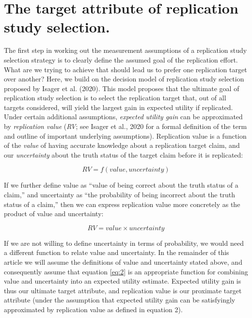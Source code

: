 \documentclass[
  english,
  man,floatsintext]{apa6}
\begin{document}
\hypertarget{the-target-attribute-of-replication-study-selection.}{%
\section{The target attribute of replication study selection.}\label{the-target-attribute-of-replication-study-selection.}}

The first step in working out the measurement assumptions of a replication study selection strategy is to clearly define the assumed goal of the replication effort. What are we trying to achieve that should lead us to prefer one replication target over another? Here, we build on the decision model of replication study selection proposed by Isager et al. (2020). This model proposes that the ultimate goal of replication study selection is to select the replication target that, out of all targets considered, will yield the largest gain in expected utility if replicated. Under certain additional assumptions, \emph{expected utility gain} can be approximated by \emph{replication value} (\emph{RV}; see Isager et al., 2020 for a formal definition of the term and outline of important underlying assumptions). Replication value is a function of the \emph{value} of having accurate knowledge about a replication target claim, and our \emph{uncertainty} about the truth status of the target claim before it is replicated:

\begin{equation} 
  \tag{1}
  RV=f(value, uncertainty)
  \label{eq:1}
\end{equation}

If we further define value as ``value of being correct about the truth status of a claim,'' and uncertainty as ``the probability of being incorrect about the truth status of a claim,'' then we can express replication value more concretely as the product of value and uncertainty:

\begin{equation} 
  \tag{2}
  RV=value\times uncertainty
  \label{eq:2}
\end{equation}

If we are not willing to define uncertainty in terms of probability, we would need a different function to relate value and uncertainty. In the remainder of this article we will assume the definitions of value and uncertainty stated above, and consequently assume that equation \eqref{eq:2} is an appropriate function for combining value and uncertainty into an expected utility estimate. Expected utility gain is thus our ultimate target attribute, and replication value is our proximate target attribute (under the assumption that expected utility gain can be satisfyingly approximated by replication value as defined in equation 2).
\end{document}
